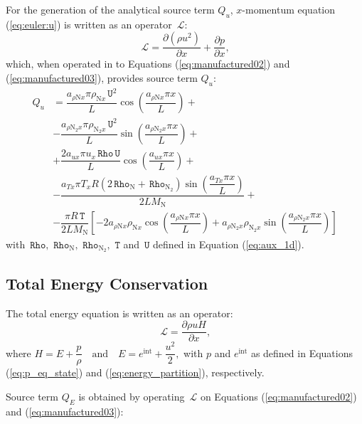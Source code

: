 \documentclass[10pt]{article}
\newcommand{\Diff}[2] {\dfrac{\partial( #1)}{\partial #2}}
\newcommand{\diff}[2] {\dfrac{\partial #1 }{\partial #2}}
\newcommand{\Lo}{\,\mathcal{L}}
\newcommand{\Rho}{\,\mathtt{Rho}}
\newcommand{\T}{\,\mathtt{T}}
\newcommand{\U}{\,\mathtt{U}}
\newcommand{\N}{\text{N}}
\begin{document}
For the generation of the analytical source term $Q_u$, $x$-momentum equation (\ref{eq:euler:u}) is written as an operator $\Lo$:
\begin{equation*}
 \label{eq:euler1d_12}
\Lo =\Diff{\rho u^2}{x}+\diff{p}{x},
\end{equation*}
which, when operated in to Equations (\ref{eq:manufactured02}) and (\ref{eq:manufactured03}), provides source term $Q_{u}$:
%
\begin{equation}
\begin{split}
Q_u &=\dfrac{ a_{  \rho \N x } \pi \rho_{\N x} \U^2  }{L}\cos\left(\dfrac{a_{  \rho \N x } \pi x}{L}\right) +\\ 
&-\dfrac{a_{  \rho \N_2 x } \pi \rho_{\N_2 x} \U^2  }{L}\sin\left(\dfrac{a_{  \rho \N_2 x } \pi x}{L}\right) +\\ 
&+\dfrac{2 a_{ux} \pi u_x \Rho \U }{L}\cos\left(\dfrac{a_{ux} \pi x}{L}\right)  +\\ 
&-\dfrac{ a_{Tx} \pi T_x R  (2 \Rho_{\N}+\Rho_{\N_2})\sin\left(\dfrac{a_{Tx} \pi x}{L}\right) }{2L M_\N} +\\ 
&-\dfrac{ \pi R \T}{2L M_\N} \left[-2 a_{  \rho \N x } \rho_{\N x} \cos\left(\dfrac{a_{  \rho \N x } \pi x}{L}\right) +a_{  \rho \N_2 x } \rho_{\N_2 x} \sin\left(\dfrac{a_{  \rho \N_2 x } \pi x}{L}\right) \right]
\end{split}
\end{equation}
with $\Rho,\,\Rho_{\text{N}},\,\Rho_{\text{N}_2},\, \T$ and $\U$ defined in Equation (\ref{eq:aux_1d}).

\subsection{Total Energy Conservation}
The total energy equation is written as an operator:
\begin{equation*}
 \label{eq:euler1d_14}
\Lo =\diff{\rho u H}{x} ,
\end{equation*}
where $H= E+ \dfrac{p}{\rho} \quad \mbox{and}\quad E=e^{\text{int}} + \dfrac{u^2 }{2} ,$ with $p$ and $e^{\text{int}}$ as defined in Equations (\ref{eq:p_eq_state}) and (\ref{eq:energy_partition}), respectively.

Source term $Q_E$ is obtained by operating $\Lo$ on Equations (\ref{eq:manufactured02}) and (\ref{eq:manufactured03}):
\end{document}
